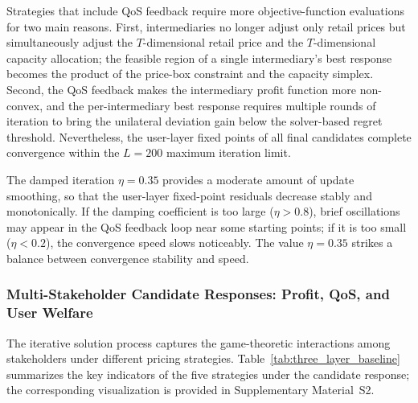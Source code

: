 \documentclass[11pt,a4paper]{article}
\begin{document}
Strategies that include QoS feedback require more objective-function evaluations for two main reasons. First, intermediaries no longer adjust only retail prices but simultaneously adjust the $T$-dimensional retail price and the $T$-dimensional capacity allocation; the feasible region of a single intermediary's best response becomes the product of the price-box constraint and the capacity simplex. Second, the QoS feedback makes the intermediary profit function more non-convex, and the per-intermediary best response requires multiple rounds of iteration to bring the unilateral deviation gain below the solver-based regret threshold. Nevertheless, the user-layer fixed points of all final candidates complete convergence within the $L=200$ maximum iteration limit.

The damped iteration $\eta=0.35$ provides a moderate amount of update smoothing, so that the user-layer fixed-point residuals decrease stably and monotonically. If the damping coefficient is too large ($\eta>0.8$), brief oscillations may appear in the QoS feedback loop near some starting points; if it is too small ($\eta<0.2$), the convergence speed slows noticeably. The value $\eta=0.35$ strikes a balance between convergence stability and speed.

\subsubsection{Multi-Stakeholder Candidate Responses: Profit, QoS, and User Welfare}
\label{sec:equilibrium_results}

The iterative solution process captures the game-theoretic interactions among stakeholders under different pricing strategies. Table~\ref{tab:three_layer_baseline} summarizes the key indicators of the five strategies under the candidate response; the corresponding visualization is provided in Supplementary Material~S2.
\end{document}
